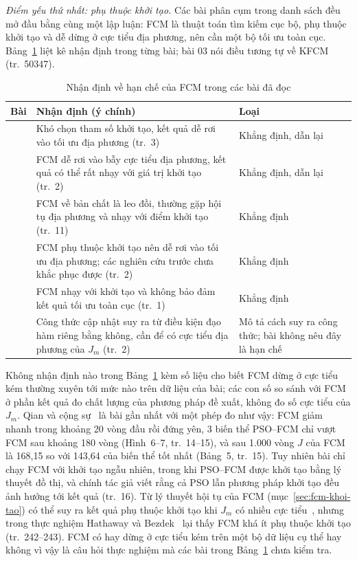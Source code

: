 \emph{Điểm yếu thứ nhất: phụ thuộc khởi tạo.} Các bài phân cụm trong danh sách đều mở đầu bằng cùng một lập luận: FCM là thuật toán tìm kiếm cục bộ, phụ thuộc khởi
tạo và dễ dừng ở cực tiểu địa phương, nên cần một bộ tối ưu toàn cục. Bảng~\ref{tab:ch1-nhan-dinh} liệt kê nhận định trong
từng bài; bài 03 nói điều tương tự về KFCM (tr.~50347).

\begin{table}[htbp]
\centering
\caption{Nhận định về hạn chế của FCM trong các bài đã đọc}
\label{tab:ch1-nhan-dinh}
\footnotesize
\renewcommand{\arraystretch}{1.15}
\begin{tabular}{@{}>{\raggedright\arraybackslash}p{2.2cm}>{\raggedright\arraybackslash}p{9.2cm}>{\raggedright\arraybackslash}p{3.0cm}@{}}
\toprule
Bài & Nhận định (ý chính) & Loại \\
\midrule
01~\cite{cui2022fpsoueba} & Khó chọn tham số khởi tạo, kết quả dễ rơi vào tối ưu địa phương (tr.~3) & Khẳng định, dẫn lại \\
02~\cite{qian2022psofcm} & FCM dễ rơi vào bẫy cực tiểu địa phương, kết quả có thể rất nhạy với giá trị khởi tạo (tr.~2) & Khẳng định, dẫn lại \\
04~\cite{zhang2025qpsofcm} & FCM về bản chất là leo đồi, thường gặp hội tụ địa phương và nhạy với điểm khởi tạo (tr.~11) & Khẳng định \\
05~\cite{sun2024mstsofcm} & FCM phụ thuộc khởi tạo nên dễ rơi vào tối ưu địa phương; các nghiên cứu trước chưa khắc phục được (tr.~2) & Khẳng định \\
06~\cite{liu2021msgwo} & FCM nhạy với khởi tạo và không bảo đảm kết quả tối ưu toàn cục (tr.~1) & Khẳng định \\
10~\cite{valdez2021bioinspired} & Công thức cập nhật suy ra từ điều kiện đạo hàm riêng bằng không, cần để có cực tiểu địa phương của $J_m$ (tr.~2) & Mô tả cách suy ra công thức; bài không nêu đây là hạn chế \\
\bottomrule
\end{tabular}
\end{table}

Không nhận định nào trong Bảng~\ref{tab:ch1-nhan-dinh} kèm số liệu cho biết FCM dừng ở cực tiểu kém thường xuyên tới mức
nào trên dữ liệu của bài; các con số so sánh với FCM ở phần kết quả đo chất lượng của phương pháp đề xuất, không đo số cực
tiểu của $J_m$. Qian và cộng sự~\cite{qian2022psofcm} là bài gần nhất với một phép đo như vậy: FCM giảm nhanh trong khoảng
20 vòng đầu rồi đứng yên, 3 biến thể PSO--FCM chỉ vượt FCM sau khoảng 180 vòng (Hình~6--7, tr.~14--15), và sau 1.000 vòng
$J$ của FCM là 168,15 so với 143,64 của biến thể tốt nhất (Bảng~5, tr.~15). Tuy nhiên bài chỉ chạy FCM với khởi tạo ngẫu
nhiên, trong khi PSO--FCM được khởi tạo bằng lý thuyết đồ thị, và chính tác giả viết rằng cả PSO lẫn phương pháp khởi tạo
đều ảnh hưởng tới kết quả (tr.~16). Từ lý thuyết hội tụ của FCM (mục~\ref{sec:fcm-khoi-tao}) có thể suy ra kết quả phụ thuộc
khởi tạo khi $J_m$ có nhiều cực tiểu~\cite{bezdek1987counterexamples}, nhưng trong thực nghiệm Hathaway và
Bezdek~\cite{hathaway1988recent} lại thấy FCM khá ít phụ thuộc khởi tạo (tr.~242--243). FCM có hay dừng ở cực tiểu kém
trên một bộ dữ liệu cụ thể hay không vì vậy là câu hỏi thực nghiệm mà các bài trong Bảng~\ref{tab:ch1-nhan-dinh} chưa kiểm tra.

